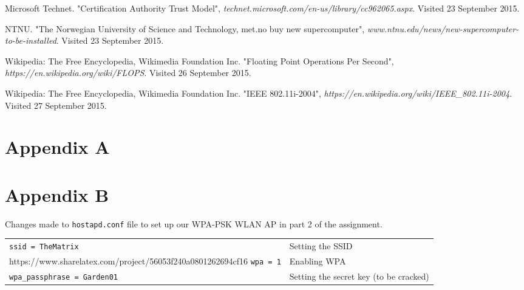 \documentclass[a4paper,11pt]{article}
\begin{document}
\begin{thebibliography}{9}
Microsoft Technet.
"Certification Authority Trust Model",
\emph{technet.microsoft.com/en-us/library/cc962065.aspx}.
Visited 23 September 2015.

NTNU.
"The Norwegian University of Science and Technology, met.no buy new supercomputer",
\emph{www.ntnu.edu/news/new-supercomputer-to-be-installed}.
Visited 23 September 2015.

Wikipedia: The Free Encyclopedia, Wikimedia Foundation Inc.
"Floating Point Operations Per Second",
\emph{https://en.wikipedia.org/wiki/FLOPS}.
Visited 26 September 2015.

Wikipedia: The Free Encyclopedia, Wikimedia Foundation Inc.
"IEEE 802.11i-2004",
\emph{https://en.wikipedia.org/wiki/IEEE\_802.11i-2004}.
Visited 27 September 2015.


\end{thebibliography}

\newpage

\section*{Appendix A} \label{sec:appendixa}

\printglossaries

\section*{Appendix B} \label{sec:appendixb}
Changes made to \texttt{hostapd.conf} file to set up our WPA-PSK WLAN AP in part 2 of the assignment. \\

\begin{tabular}{ll}
\texttt{ssid = TheMatrix} & Setting the SSID \\https://www.sharelatex.com/project/56053f240a0801262694cf16
\texttt{wpa = 1} & Enabling WPA\\
\texttt{wpa\_passphrase = Garden01}  & Setting the secret key (to be cracked)\\
\end{tabular}
\end{document}
